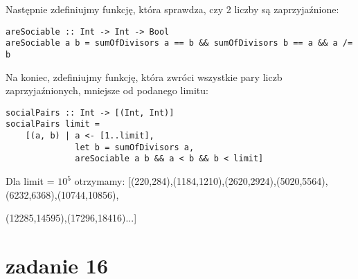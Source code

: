 \documentclass[11pt,a4paper]{article}
\begin{document}
Następnie zdefiniujmy funkcję, która sprawdza, czy 2 liczby są zaprzyjaźnione:
\begin{verbatim}
areSociable :: Int -> Int -> Bool
areSociable a b = sumOfDivisors a == b && sumOfDivisors b == a && a /= b
\end{verbatim}

Na koniec, zdefiniujmy funkcję, która zwróci wszystkie pary liczb zaprzyjaźnionych, mniejsze od podanego limitu:
\begin{verbatim}
socialPairs :: Int -> [(Int, Int)]
socialPairs limit =
    [(a, b) | a <- [1..limit],
              let b = sumOfDivisors a,
              areSociable a b && a < b && b < limit]
\end{verbatim}

Dla limit = $10^5$ otrzymamy:
[(220,284),(1184,1210),(2620,2924),(5020,5564),(6232,6368),(10744,10856), \par (12285,14595),(17296,18416)...]

\bigskip
\section*{zadanie 16}
\end{document}
